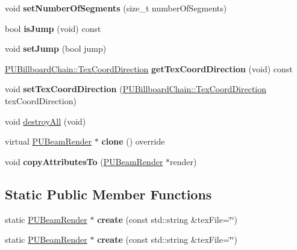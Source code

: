 \begin{DoxyCompactItemize}
void {\bfseries set\+Number\+Of\+Segments} (size\+\_\+t number\+Of\+Segments)
\item 
\mbox{\label{classPUBeamRender_a812ab20f7988abfefba5401b4162ce01}} 
bool {\bfseries is\+Jump} (void) const
\item 
\mbox{\label{classPUBeamRender_a18c5bc322f76811d5380edbd4dd9ac7c}} 
void {\bfseries set\+Jump} (bool jump)
\item 
\mbox{\label{classPUBeamRender_a4dc40efadb4c52bc49918d8667cb9581}} 
\hyperlink{classPUBillboardChain_a6ebaec09a615199356b9d50fdab2209f}{P\+U\+Billboard\+Chain\+::\+Tex\+Coord\+Direction} {\bfseries get\+Tex\+Coord\+Direction} (void) const
\item 
\mbox{\label{classPUBeamRender_a5b58b1d933ba62d77687c3d4e18b972b}} 
void {\bfseries set\+Tex\+Coord\+Direction} (\hyperlink{classPUBillboardChain_a6ebaec09a615199356b9d50fdab2209f}{P\+U\+Billboard\+Chain\+::\+Tex\+Coord\+Direction} tex\+Coord\+Direction)
\item 
void \hyperlink{classPUBeamRender_a17f26eb0e5608cfa4b4c9b16e4a5ccb5}{destroy\+All} (void)
\item 
\mbox{\label{classPUBeamRender_a82e53aa0101ac126adf6af19063db974}} 
virtual \hyperlink{classPUBeamRender}{P\+U\+Beam\+Render} $\ast$ {\bfseries clone} () override
\item 
\mbox{\label{classPUBeamRender_abb134ff31424a6a933d165edef351de5}} 
void {\bfseries copy\+Attributes\+To} (\hyperlink{classPUBeamRender}{P\+U\+Beam\+Render} $\ast$render)
\end{DoxyCompactItemize}
\subsection*{Static Public Member Functions}
\begin{DoxyCompactItemize}
\item 
\mbox{\label{classPUBeamRender_a4444fb6589fbe366a3e022d242cedc7b}} 
static \hyperlink{classPUBeamRender}{P\+U\+Beam\+Render} $\ast$ {\bfseries create} (const std\+::string \&tex\+File=\char`\"{}\char`\"{})
\item 
\mbox{\label{classPUBeamRender_ae2d9caf6b4718c10afd35b16d9f2c8de}} 
static \hyperlink{classPUBeamRender}{P\+U\+Beam\+Render} $\ast$ {\bfseries create} (const std\+::string \&tex\+File=\char`\"{}\char`\"{})
\end{DoxyCompactItemize}

